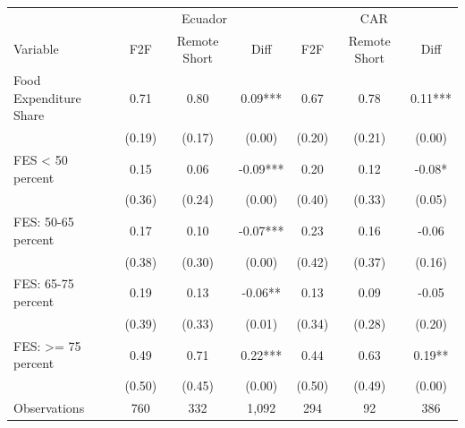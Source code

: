 \begin{tabular}{l*{6}c}
\hline\hline
 & \multicolumn{3}{c}{Ecuador} & \multicolumn{3}{c}{CAR}\\ 
Variable & F2F & Remote Short & Diff & F2F & Remote Short & Diff \\
\hline
Food Expenditure Share&0.71&0.80&0.09***&0.67&0.78&0.11***\\
&(0.19)&(0.17)&(0.00)&(0.20)&(0.21)&(0.00)\\
FES < 50 percent&0.15&0.06&-0.09***&0.20&0.12&-0.08*\\
&(0.36)&(0.24)&(0.00)&(0.40)&(0.33)&(0.05)\\
FES: 50-65 percent&0.17&0.10&-0.07***&0.23&0.16&-0.06\\
&(0.38)&(0.30)&(0.00)&(0.42)&(0.37)&(0.16)\\
FES: 65-75 percent&0.19&0.13&-0.06**&0.13&0.09&-0.05\\
&(0.39)&(0.33)&(0.01)&(0.34)&(0.28)&(0.20)\\
FES: >= 75 percent&0.49&0.71&0.22***&0.44&0.63&0.19**\\
&(0.50)&(0.45)&(0.00)&(0.50)&(0.49)&(0.00)\\
\hline
Observations & 760 & 332 & 1,092 & 294 & 92 & 386 \\
\hline\hline
\end{tabular}
